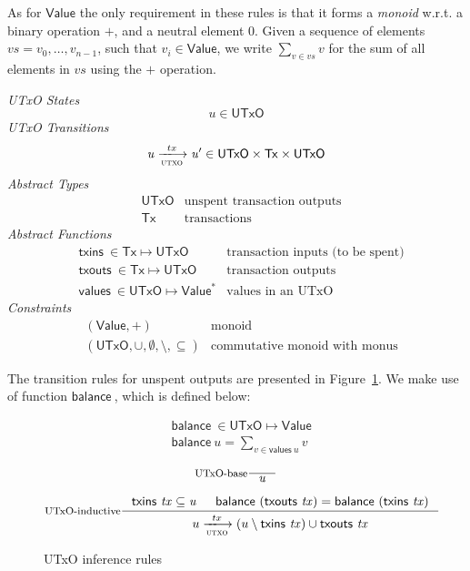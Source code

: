 \documentclass[11pt,a4paper]{article}
\newcommand{\var}[1]{\mathit{#1}}
\newcommand{\fun}[1]{\mathsf{#1}}
\newcommand{\type}[1]{\mathsf{#1}}
\newcommand{\trans}[2]{\xlongrightarrow[\textsc{#1}]{#2}}
\newcommand{\seqof}[1]{#1^{*}}
\newcommand{\nextdef}{\\[1em]}
\newcommand{\Tx}{\type{Tx}}
\newcommand{\UTxO}{\type{UTxO}}
\newcommand{\Value}{\type{Value}}
\newcommand{\txins}[1]{\fun{txins}\ \var{#1}}
\newcommand{\txouts}[1]{\fun{txouts}\ \var{#1}}
\newcommand{\values}[1]{\fun{values}\ #1}
\newcommand{\balance}[1]{\fun{balance}\ \var{#1}}
\begin{document}
As for $\Value$ the only requirement in these rules is that it forms a
\textit{monoid} w.r.t. a binary operation $+$, and a neutral element $0$. Given
a sequence of elements $\var{vs} = v_0, \ldots, v_{n-1}$, such that $v_i \in \Value$, we
write $\sum_{v \in \var{vs}} v$ for the sum of all elements in $\var{vs}$ using
the $+$ operation.

\begin{figure*}[h]
  \emph{UTxO States}
  \begin{equation*}
    \var{u} \in \UTxO
  \end{equation*}
  \emph{UTxO Transitions}
  \begin{equation*}
    \var{u} \trans{utxo}{tx} \var{u'}
    \in \UTxO \times \Tx \times \UTxO
  \end{equation*}
  \emph{Abstract Types}
  \begin{align*}
    & \type{UTxO} & \text{unspent transaction outputs}
    \nextdef
    & \type{Tx} & \text{transactions}
  \end{align*}
  \emph{Abstract Functions}
  \begin{align*}
    & \txins{} \in \Tx \mapsto \UTxO & \text{transaction inputs (to be spent)}
    \nextdef
    & \txouts{} \in \Tx \mapsto \UTxO & \text{transaction outputs}
    \nextdef
    & \values{} \in \UTxO \mapsto \seqof{\Value} & \text{values in an UTxO}
  \end{align*}
  \emph{Constraints}
  \begin{align*}
    & (\Value, +) & \text{monoid}\\
    & (\UTxO, \cup, \emptyset, \setminus, \subseteq) & \text{commutative monoid with monus}
  \end{align*}
  \caption{Definitions associated to the UTxO transition system}
  \label{fig:state-trans-utxo-defs}
\end{figure*}

The transition rules for unspent outputs are presented in
Figure~\ref{fig:state-trans-utxo}. We make use of function $\balance{}$, which is
defined below:

\begin{align*}
  & \balance{} \in \UTxO \mapsto \Value\\
  & \balance{u} = \sum_{v \in \values{u}} v
\end{align*}

\begin{figure}[h]

  \centering
  \begin{equation}\label{eq:utxo-base}
    \inference[UTxO-base]
    {}
    {\var{u}}
  \end{equation}

  \begin{equation}\label{eq:utxo-inductive}
    \inference[UTxO-inductive]
    { \txins{tx} \subseteq \mathit{u}
      & \balance{(\txouts{tx})} = \balance{(\txins{tx})}
    }
    {u \trans{utxo}{tx} (u \setminus \txins{tx}) \cup \txouts{tx}}
  \end{equation}
  \caption{UTxO inference rules}
  \label{fig:state-trans-utxo}
\end{figure}
\end{document}
